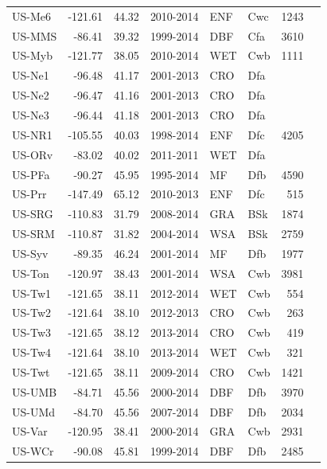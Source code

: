 \documentclass{myreport}
\begin{document}
\begin{longtable}{lrrlllrl}
 US-Me6 & -121.61 & 44.32 & 2010-2014 & ENF & Cwc & 1243 & \cite{US-Me6} \\ 
 US-MMS & -86.41 & 39.32 & 1999-2014 & DBF & Cfa & 3610 & \cite{US-MMS} \\ 
 US-Myb & -121.77 & 38.05 & 2010-2014 & WET & Cwb & 1111 & \cite{US-Myb} \\ 
 US-Ne1 & -96.48 & 41.17 & 2001-2013 & CRO & Dfa &  & \cite{US-Ne1} \\ 
 US-Ne2 & -96.47 & 41.16 & 2001-2013 & CRO & Dfa &  & \cite{US-Ne2} \\ 
 US-Ne3 & -96.44 & 41.18 & 2001-2013 & CRO & Dfa &  & \cite{US-Ne3} \\ 
 US-NR1 & -105.55 & 40.03 & 1998-2014 & ENF & Dfc & 4205 & \cite{US-NR1} \\ 
 US-ORv & -83.02 & 40.02 & 2011-2011 & WET & Dfa &  & \cite{US-ORv} \\ 
 US-PFa & -90.27 & 45.95 & 1995-2014 & MF & Dfb & 4590 & \cite{US-PFa} \\ 
 US-Prr & -147.49 & 65.12 & 2010-2013 & ENF & Dfc & 515 & \cite{US-Prr} \\ 
 US-SRG & -110.83 & 31.79 & 2008-2014 & GRA & BSk & 1874 & \cite{US-SRG} \\ 
 US-SRM & -110.87 & 31.82 & 2004-2014 & WSA & BSk & 2759 & \cite{US-SRM} \\ 
 US-Syv & -89.35 & 46.24 & 2001-2014 & MF & Dfb & 1977 & \cite{US-Syv} \\ 
 US-Ton & -120.97 & 38.43 & 2001-2014 & WSA & Cwb & 3981 & \cite{US-Ton} \\ 
 US-Tw1 & -121.65 & 38.11 & 2012-2014 & WET & Cwb & 554 & \cite{US-Tw1} \\ 
 US-Tw2 & -121.64 & 38.10 & 2012-2013 & CRO & Cwb & 263 & \cite{US-Tw2} \\ 
 US-Tw3 & -121.65 & 38.12 & 2013-2014 & CRO & Cwb & 419 & \cite{US-Tw3} \\ 
 US-Tw4 & -121.64 & 38.10 & 2013-2014 & WET & Cwb & 321 & \cite{US-Tw4} \\ 
 US-Twt & -121.65 & 38.11 & 2009-2014 & CRO & Cwb & 1421 & \cite{US-Twt} \\ 
 US-UMB & -84.71 & 45.56 & 2000-2014 & DBF & Dfb & 3970 & \cite{US-UMB} \\ 
 US-UMd & -84.70 & 45.56 & 2007-2014 & DBF & Dfb & 2034 & \cite{US-UMd} \\ 
 US-Var & -120.95 & 38.41 & 2000-2014 & GRA & Cwb & 2931 & \cite{US-Var} \\ 
 US-WCr & -90.08 & 45.81 & 1999-2014 & DBF & Dfb & 2485 & \cite{US-WCr} \\ 

\end{longtable}
\end{document}

